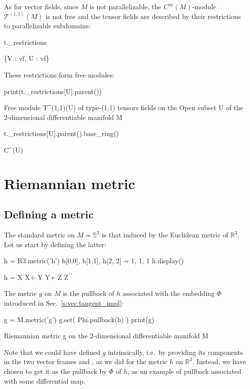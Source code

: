 As for vector fields, since $M$ is not parallelizable, the $C^\infty(M)$-module
$\mathcal{T}^{(1,1)}(M)$ is not free and the tensor fields are described by
their restrictions to parallelizable subdomains:
\begin{NBin}
t._restrictions
\end{NBin}
\begin{NBoutM}
\left\{V : v\otimes {}f, U : v\otimes {}f\right\}
\end{NBoutM}
These restrictions form free modules:
\begin{NBin}
print(t._restrictions[U].parent())
\end{NBin}
\begin{NBprint}
Free module T^(1,1)(U) of type-(1,1) tensors fields on the Open subset U of
the 2-dimensional differentiable manifold M
\end{NBprint}
\begin{NBin}
t._restrictions[U].parent().base_ring()
\end{NBin}
\begin{NBoutM}
C^{\infty}\left(U\right)
\end{NBoutM}


\section{Riemannian metric}

\subsection{Defining a metric}

The standard metric on $M=\mathbb{S}^2$ is that induced by the Euclidean metric of $\mathbb{R}^3$. Let us start by defining the latter:
\begin{NBin}
h = R3.metric('h')
h[0,0], h[1,1], h[2, 2] = 1, 1, 1
h.display()
\end{NBin}
\begin{NBoutM}
h =  X\otimes {} X+ Y\otimes {} Y+ Z\otimes {} Z
\end{NBoutM}
The metric $g$ on $M$ is the pullback of $h$ associated with the embedding $\Phi$
introduced in Sec.~\ref{s:vec:tangent_impl}:
\begin{NBin}
g = M.metric('g')
g.set( Phi.pullback(h) )
print(g)
\end{NBin}
\begin{NBprint}
Riemannian metric g on the 2-dimensional differentiable manifold M
\end{NBprint}
Note that we could have defined $g$ intrinsically, i.e.\ by providing its components in the two vector frames  and , as we did for the metric $h$ on $\mathbb{R}^3$. Instead, we have chosen to get it as the pullback by $\Phi$ of $h$, as an example of pullback associated with some differential map.

